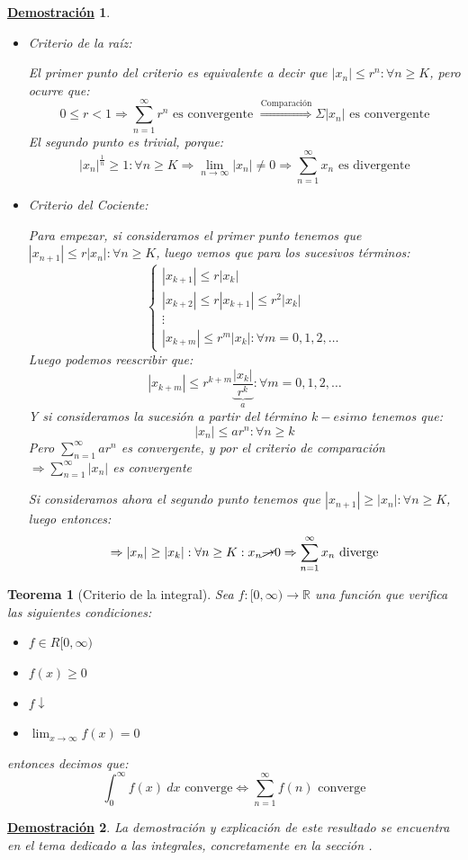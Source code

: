 \documentclass[10pt,a4paper,openright]{book}
\theoremstyle{break}
\newtheorem{theo}{Teorema}[chapter]
\newtheorem*{demo}{\underline{Demostración}}
\newcommand{\dif}[1]{\ d#1}
\begin{document}
\begin{demo}
\begin{itemize}
\item Criterio de la raíz:

El primer punto del criterio es equivalente a decir que $|x_n| \leq r^n : \forall n \geq K$, pero ocurre que:
$$0 \leq r < 1 \Rightarrow \sum_{n=1}^{\infty} r^n \mbox{ es convergente }\overset{\mbox{Comparación}}{\Rightarrow} \Sigma |x_n| \mbox{ es convergente}$$
El segundo punto es trivial, porque:
$$|x_n|^{\frac{1}{n}} \geq 1 : \forall n \geq K \Rightarrow \lim_{n \to  \infty} |x_n| \neq 0 \Rightarrow \sum_{n=1}^\infty x_n \mbox{ es divergente}$$

\item Criterio del Cociente:

Para empezar, si consideramos el primer punto tenemos que $ |x_{n+1} | \leq r |x_n|: \forall n \geq K $, luego vemos que para los sucesivos términos:
$$\begin{cases}|x_{k+1}| \leq r |x_k| \\ |x_{k+2}|\leq r |x_{k+1}| \leq r^2 |x_k| \\ \vdots \\ |x_{k+m}| \leq r^m |x_k| : \forall m = 0,1,2,\ldots \end{cases}$$
Luego podemos reescribir que:
$$|x_{k+m}| \leq r^{k+m} \underbrace{\frac{|x_k|}{r^k}}_a : \forall m = 0,1,2,\ldots$$
Y si consideramos la sucesión a partir del término $k-esimo$ tenemos que:
$$|x_n| \leq a r^n : \forall n \geq k$$
Pero $\sum_{n=1}^{\infty} a r^n$ es convergente, y por el criterio de comparación $\Rightarrow \sum_{n=1}^{\infty} |x_n|$ es convergente

Si consideramos ahora el segundo punto tenemos que $|x_{n+1}| \geq |x_n|: \forall n \geq K $, luego entonces:
$$\Rightarrow |x_n| \geq |x_k|: \forall n \geq K: x_n \cancel{\rightarrow} 0 \Rightarrow  \sum_{n=1}^\infty x_n \mbox{ diverge}$$
\end{itemize}
\end{demo}

\begin{theo}[Criterio de la integral]
Sea $f:[0, \infty)\rightarrow \mathbb R$ una función que verifica las siguientes condiciones:
\begin{itemize}
\item $f\in R[0,\infty)$
\item $f(x)\geq 0 $
\item $f\downarrow$
\item $\lim_{x \rightarrow \infty} f(x) = 0$
\end{itemize}
entonces decimos que:
\[
\int_{0}^{\infty} f(x) \dif{x} \mbox{ converge} \Leftrightarrow \sum_{n = 1 }^{\infty} f(n)\mbox{ converge}
\]
\end{theo}
\begin{demo}
La demostración y explicación de este resultado se encuentra en el tema dedicado a las integrales, concretamente en la sección .
\end{demo}
\end{document}

